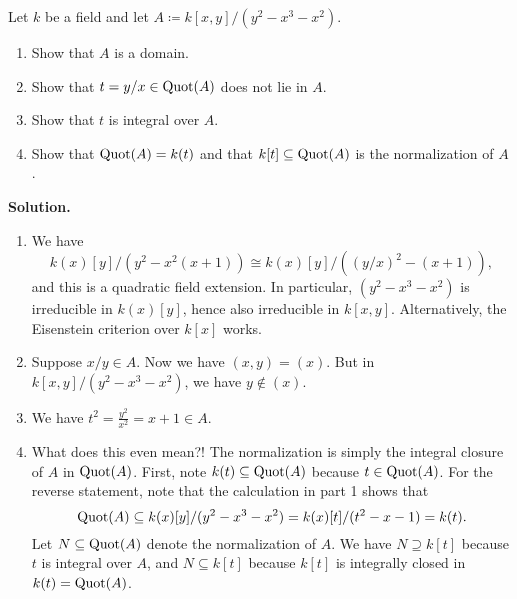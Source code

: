 \documentclass[a4paper,11pt]{article}
\begin{document}
Let $k$ be a field and let $A \coloneqq k[x,y]/(y^2-x^3-x^2)$. 
\begin{enumerate}
    \item Show that $A$ is a domain.
    \item Show that $t = y/x \in \mathrm{Quot}(A)$ does not lie in $A$.
    \item Show that $t$ is integral over $A$.
    \item Show that $\mathrm{Quot}(A) = k(t)$ and that $k[t] \subseteq \mathrm{Quot}(A)$ is 
        the normalization of $A$. 
\end{enumerate}
\textbf{Solution.}
\begin{enumerate}
    \item We have 
        $$k(x)[y]/(y^2 - x^2(x+1)) \cong k(x)[y]/((y/x)^2 - (x+1)),$$
        and this is a quadratic field extension. In particular, $(y^2 - x^3 - x^2)$
        is irreducible in $k(x)[y]$, hence also irreducible in $k[x,y]$. 
        Alternatively, the Eisenstein criterion over $k[x]$ works.
    \item Suppose $x/y \in A$. Now we have $(x,y) = (x)$. But in $k[x,y]/(y^2 -
        x^3 -x^2)$, we have $y \not \in (x)$.  
    \item We have $t^2 = \frac{y^2}{x^2} = x + 1 \in A$.
    \item What does this even mean?! The normalization is simply the integral closure
        of $A$ in $\mathrm{Quot}(A)$. First, note $k(t) \subseteq \mathrm{Quot}(A)$ because 
        $t \in \mathrm{Quot}(A)$. For the reverse statement, note that the calculation 
        in part 1 shows that 
        $$\mathrm{Quot}(A) \subseteq k(x)[y]/(y^2 - x^3- x^2) = k(x)[t]/(t^2 - x -1)=k(t).$$
        Let $N \subseteq \mathrm{Quot}(A)$ denote the normalization of $A$. We have 
        $N \supseteq k[t]$ because $t$ is integral over $A$, and $N \subseteq k[t]$
        because $k[t]$ is integrally closed in $k(t) = \mathrm{Quot}(A)$. 
\end{enumerate}

\contactend
\end{document}
